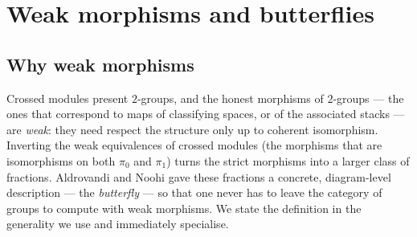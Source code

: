 \documentclass[11pt]{article}
\theoremstyle{definition}
\newcommand{\pizero}{\pi_0}
\newcommand{\pione}{\pi_1}
\begin{document}
\section{Weak morphisms and butterflies}\label{sec:butterfly}

\subsection{Why weak morphisms}

Crossed modules present $2$-groups, and the honest morphisms of $2$-groups --- the ones that
correspond to maps of classifying spaces, or of the associated stacks --- are \emph{weak}: they
need respect the structure only up to coherent isomorphism. Inverting the weak equivalences of
crossed modules (the morphisms that are isomorphisms on both $\pizero$ and $\pione$) turns the
strict morphisms into a larger class of fractions. Aldrovandi and Noohi \cite{butterflies} gave
these fractions a concrete, diagram-level description --- the \emph{butterfly} --- so that one never
has to leave the category of groups to compute with weak morphisms. We state the definition in the
generality we use and immediately specialise.
\end{document}
